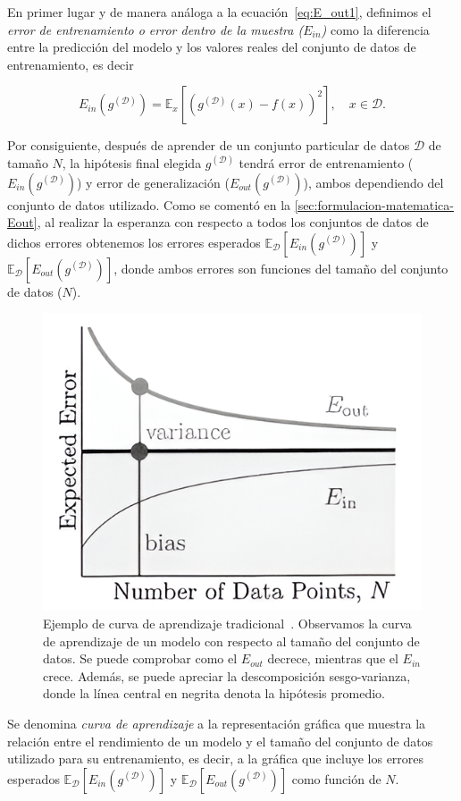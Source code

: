En primer lugar y de manera análoga a la ecuación~\eqref{eq:E_out1}, definimos el \emph{error de entrenamiento o error dentro de la muestra ($E_{in}$)} como la diferencia entre la predicción del modelo y los valores reales del conjunto de datos de entrenamiento, es decir

\begin{equation}\label{eq:E_in1}
    E_{in}(g^{\mathcal{(D)}}) = \mathbb{E}_{x}[{(g^{\mathcal{(D)}}(x) - f(x))}^2], \quad x \in \mathcal{D}.
\end{equation}

Por consiguiente, después de aprender de un conjunto particular de datos $\mathcal{D}$ de tamaño $N$, la hipótesis final elegida $g^{(\mathcal{D})}$ tendrá error de entrenamiento ($E_{in}(g^{(\mathcal{D})})$) y error de generalización ($E_{out}(g^{(\mathcal{D})})$), ambos dependiendo del conjunto de datos utilizado. Como se comentó en la \autoref{sec:formulacion-matematica-Eout}, al realizar la esperanza con respecto a todos los conjuntos de datos de dichos errores obtenemos los errores esperados $\mathbb{E}_{\mathcal{D}}[E_{in}(g^{(\mathcal{D})})]$ y $\mathbb{E}_{\mathcal{D}}[E_{out}(g^{(\mathcal{D})})]$, donde ambos errores son funciones del tamaño del conjunto de datos ($N$).

\begin{figure}[h]
    \centering
    \includegraphics[width=0.4\linewidth]{img/learning-curve.png}
    \caption[Ejemplo de curva de aprendizaje tradicional~\cite{Mostafa2012}.] {Ejemplo de curva de aprendizaje tradicional~\cite{Mostafa2012}. Observamos la curva de aprendizaje de un modelo con respecto al tamaño del conjunto de datos. Se puede comprobar como el $E_{out}$ decrece, mientras que el $E_{in}$ crece. Además, se puede apreciar la descomposición sesgo-varianza, donde la línea central en negrita denota la hipótesis promedio.}\label{fig:learning-curve-bias-variance}
\end{figure}

Se denomina \emph{curva de aprendizaje} a la representación gráfica que muestra la relación entre el rendimiento de un modelo y el tamaño del conjunto de datos utilizado para su entrenamiento, es decir, a la gráfica que incluye los errores esperados $\mathbb{E}_{\mathcal{D}}[E_{in}(g^{(\mathcal{D})})]$ y $\mathbb{E}_{\mathcal{D}}[E_{out}(g^{(\mathcal{D})})]$ como función de $N$.

